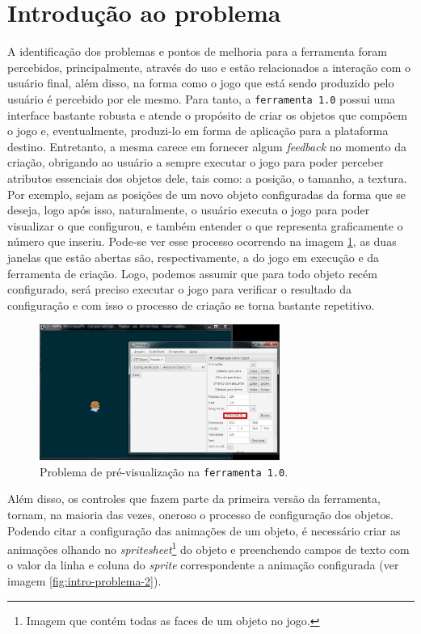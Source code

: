 \documentclass[12pt,oneside,openright,a4paper,english,brazil,sumario=tradicional]{abntex2}
\begin{document}
\section{Introdução ao problema}
\label{sec:intro-problema}
A identificação dos problemas e pontos de melhoria para a ferramenta foram percebidos, principalmente, através do uso e estão relacionados a interação com o usuário final, além disso, na forma como o jogo que está sendo produzido pelo usuário é percebido por ele mesmo.
Para tanto, a \texttt{ferramenta 1.0} possui uma interface bastante robusta e atende o propósito de criar os objetos que compõem o jogo e, eventualmente, produzi-lo em forma de aplicação para a plataforma destino.
Entretanto, a mesma carece em fornecer algum \emph{feedback} no momento da criação, obrigando ao usuário a sempre executar o jogo para poder perceber atributos essenciais dos objetos dele, tais como: a posição, o tamanho, a textura.
Por exemplo, sejam as posições de um novo objeto configuradas da forma que se deseja, logo após isso, naturalmente, o usuário executa o jogo para poder visualizar o que configurou, e também entender o que representa graficamente o número que inseriu.
Pode-se ver esse processo ocorrendo na imagem \ref{fig:intro-problema-1}, as duas janelas que estão abertas são, respectivamente, a do jogo em execução e da ferramenta de criação.
Logo, podemos assumir que para todo objeto recém configurado, será preciso executar o jogo para verificar o resultado da configuração e com isso o processo de criação se torna bastante repetitivo.

\begin{figure}[h]
   \centering
   \includegraphics[width=0.7\textwidth]{images/problema-1.jpg}
   \caption{Problema de pré-visualização na \texttt{ferramenta 1.0}.}
   \label{fig:intro-problema-1}
\end{figure}

Além disso, os controles que fazem parte da primeira versão da ferramenta, tornam, na maioria das vezes, oneroso o processo de configuração dos objetos. Podendo citar a configuração das animações de um objeto, é necessário criar as animações olhando no \emph{spritesheet}\footnote{Imagem que contém todas as faces de um objeto no jogo.} do objeto e preenchendo campos de texto com o valor da linha e coluna do \emph{sprite} correspondente a animação configurada (ver imagem \ref{fig:intro-problema-2}).
\end{document}

